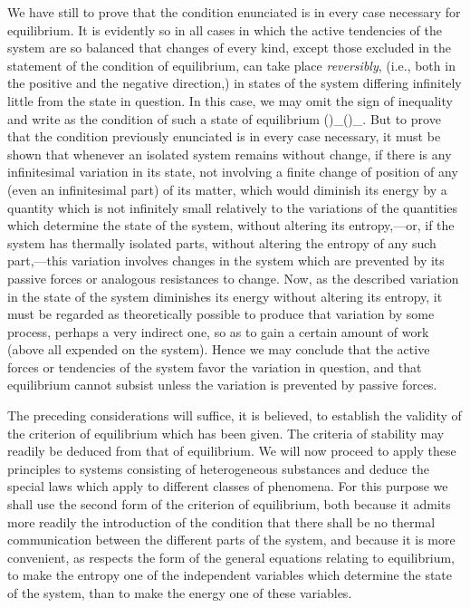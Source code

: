\documentclass[12pt]{memoir}
\begin{document}
We have still to prove that the condition enunciated is in every case necessary for equilibrium. It is evidently so in all cases in which the active tendencies of the system are so balanced that changes of every kind, except those excluded in the statement of the condition of equilibrium, can take place \textit{reversibly}, (i.e., both in the positive and the negative direction,) in states of the system differing infinitely little from the state in question. In this case, we may omit the sign of inequality and write as the condition of such a state of equilibrium
\eqs
(\delta \eta)_(\delta \epsilon)_. \label{10}
\eqe
But to prove that the condition previously enunciated is in every case necessary, it must be shown that whenever an isolated system remains without change, if there is any infinitesimal variation in its state, not involving a finite change of position of any (even an infinitesimal part) of its matter, which would diminish its energy by a quantity which is not infinitely small relatively to the variations of the quantities which determine the state of the system, without altering its entropy,---or, if the system has thermally isolated parts, without altering the entropy of any such part,---this variation involves changes in the system which are prevented by its passive forces or analogous resistances to change. Now, as the described variation in the state of the system diminishes its energy without altering its entropy, it must be regarded as theoretically possible to produce that variation by some process, perhaps a very indirect one, so as to gain a certain amount of work (above all expended on the system). Hence we may conclude that the active forces or tendencies of the system favor the variation in question, and that equilibrium cannot subsist unless the variation is prevented by passive forces.

The preceding considerations will suffice, it is believed, to establish the validity of the criterion of equilibrium which has been given. The criteria of stability may readily be deduced from that of equilibrium. We will now proceed to apply these principles to systems consisting of heterogeneous substances and deduce the special laws which apply to different classes of phenomena. For this purpose we shall use the second form of the criterion of equilibrium, both because it admits more readily the introduction of the condition that there shall be no thermal communication between the different parts of the system, and because it is more convenient, as respects the form of the general equations relating to equilibrium, to make the entropy one of the independent variables which determine the state of the system, than to make the energy one of these variables.
\end{document}

